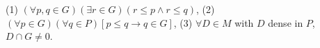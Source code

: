 (1) $(\forall p, q \in G)(\exists r \in G)(r \leq p \land r \leq q)$,
(2) $(\forall p \in G)(\forall q \in P)[p \leq q \rightarrow q \in G]$,
(3) $\forall D \in M$ with $D$ dense in $P$, $D \cap G \neq 0$.
